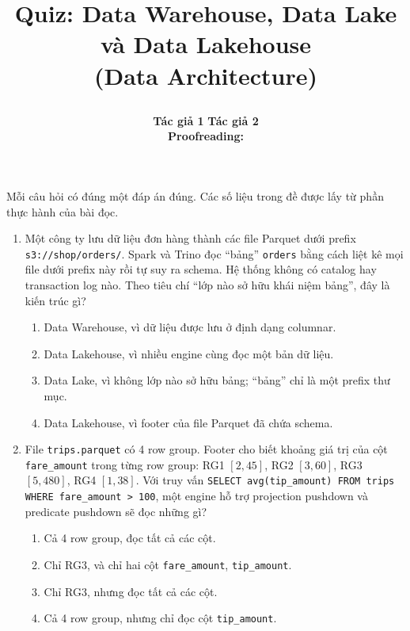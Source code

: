 \documentclass[12pt]{article}
\title{%
  \parbox[c][\TitleBlockHeight][c]{0.90\textwidth}{%
    \centering
    {\fontsize{20pt}{24pt}\selectfont\bfseries Quiz: Data Warehouse, Data Lake\\ và Data Lakehouse}\\[6pt]
    {\fontsize{13pt}{15pt}\selectfont (Data Architecture)}
  }%
}
\author{%
  \textbf{Tác giả 1}
  \hspace{2.8em}
  \textbf{Tác giả 2}\\
  \vspace{1em}
  \textbf{Proofreading: }
}
\date{}
\begin{document}
\maketitle
\thispagestyle{firstpage}
\vspace{-3em}
\noindent Mỗi câu hỏi có đúng một đáp án đúng. Các số liệu trong đề được lấy từ phần thực hành của bài đọc.

\begin{enumerate}[label=\textbf{\arabic*.}, leftmargin=1.6em, itemsep=1.2em]
\item Một công ty lưu dữ liệu đơn hàng thành các file Parquet dưới prefix \texttt{s3://shop/orders/}. Spark và Trino đọc ``bảng'' \texttt{orders} bằng cách liệt kê mọi file dưới prefix này rồi tự suy ra schema. Hệ thống không có catalog hay transaction log nào. Theo tiêu chí ``lớp nào sở hữu khái niệm bảng'', đây là kiến trúc gì?

\begin{enumerate}[label=\alph*), leftmargin=2.2em, itemsep=1pt]
    \item Data Warehouse, vì dữ liệu được lưu ở định dạng columnar.
    \item Data Lakehouse, vì nhiều engine cùng đọc một bản dữ liệu.
    \item Data Lake, vì không lớp nào sở hữu bảng; ``bảng'' chỉ là một prefix thư mục.
    \item Data Lakehouse, vì footer của file Parquet đã chứa schema.
\end{enumerate}

\item File \texttt{trips.parquet} có 4 row group. Footer cho biết khoảng giá trị của cột \texttt{fare\_amount} trong từng row group: RG1 $[2, 45]$, RG2 $[3, 60]$, RG3 $[5, 480]$, RG4 $[1, 38]$. Với truy vấn \texttt{SELECT avg(tip\_amount) FROM trips WHERE fare\_amount > 100}, một engine hỗ trợ projection pushdown và predicate pushdown sẽ đọc những gì?

\begin{enumerate}[label=\alph*), leftmargin=2.2em, itemsep=1pt]
    \item Cả 4 row group, đọc tất cả các cột.
    \item Chỉ RG3, và chỉ hai cột \texttt{fare\_amount}, \texttt{tip\_amount}.
    \item Chỉ RG3, nhưng đọc tất cả các cột.
    \item Cả 4 row group, nhưng chỉ đọc cột \texttt{tip\_amount}.
\end{enumerate}


\end{enumerate}
\end{document}
